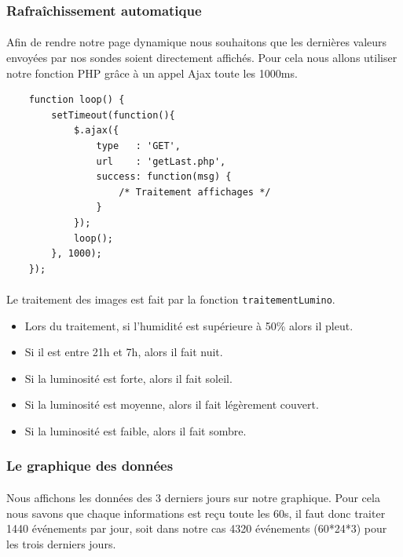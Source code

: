 \documentclass[a4paper, titlepage, oneside, 12pt]{article}%
\begin{document}
\subsubsection{Rafraîchissement automatique}
\paragraph{}
Afin de rendre notre page dynamique nous souhaitons que les dernières valeurs envoyées par nos sondes soient directement affichés. Pour cela nous allons utiliser notre fonction PHP grâce à un appel Ajax toute les 1000ms.\\
\begin{lstlisting}
	function loop() {
		setTimeout(function(){
			$.ajax({
				type   : 'GET',
				url    : 'getLast.php',
				success: function(msg) {
					/* Traitement affichages */
				}
			});
			loop();
		}, 1000);
	});
\end{lstlisting}
\paragraph{}
Le traitement des images est fait par la fonction \texttt{traitementLumino}. 
\begin{itemize}
	\item Lors du traitement, si l'humidité est supérieure à 50\% alors il pleut.
	\item Si il est entre 21h et 7h, alors il fait nuit.
	\item Si la luminosité est forte, alors il fait soleil.
	\item Si la luminosité est moyenne, alors il fait légèrement couvert.
	\item Si la luminosité est faible, alors il fait sombre.\\
\end{itemize}
\paragraph{}

\subsubsection{Le graphique des données}
\paragraph{}
 Nous affichons les données des 3 derniers jours sur notre graphique. Pour cela nous savons que chaque informations est reçu toute les 60s, il faut donc traiter 1440 événements par jour, soit dans notre cas 4320 événements (60*24*3) pour les trois derniers jours.
\end{document}
